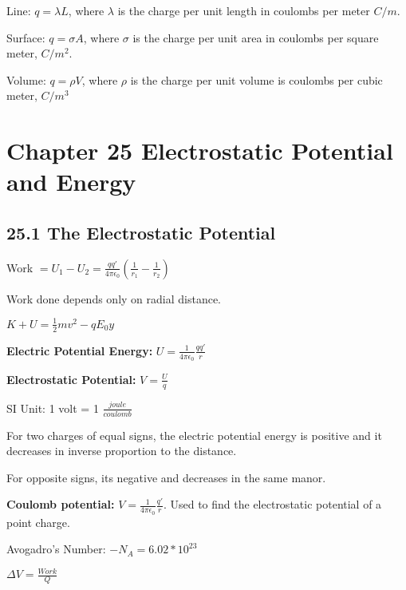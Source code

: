 \documentclass[twocolumn]{article}
\newenvironment{small_item}{
\begin{itemize}
  \setlength{\itemsep}{.25pt}
  \setlength{\parskip}{0pt}
  \setlength{\parsep}{0pt}
}{\end{itemize}}
\begin{document}
	\begin{small_item}
		\item Line: $q = \lambda L$, where $\lambda$ is the charge per unit length in coulombs per meter $C/m$.
		\item Surface: $q = \sigma A$, where $\sigma$ is the charge per unit area in coulombs per square meter, $C/m^2$.
		\item Volume: $q = \rho V$, where $\rho$ is the charge per unit volume is coulombs per cubic meter, $C/m^3$
	\end{small_item}
	
	
	
	
	\section*{Chapter 25 Electrostatic Potential and Energy} %
	\label{sec:chapter_25_electrostatic_potential_and_energy}
	
	\subsection*{25.1 The Electrostatic Potential} %
	\label{sub:25_1_the_electrostatic_potential}
	
	\begin{small_item}
		\item Work $= U_1 - U_2 = \frac{qq'}{4\pi\epsilon_0}(\frac{1}{r_1}
		-\frac{1}{r_2})$
		\item Work done depends only on radial distance.
		\item $K + U = \frac{1}{2}mv^2 - qE_0y$
		\item \textbf{Electric Potential Energy:} $U = \frac{1}{4\pi\epsilon_0}\frac{qq'}{r}$
		\item \textbf{Electrostatic Potential:} $V = \frac{U}{q}$
		\item SI Unit: 1 volt = 1 $\frac{joule}{coulomb}$
		\item For two charges of equal signs, the electric potential energy is positive and it decreases in inverse proportion to the distance.
		\item For opposite signs, its negative and decreases in the same manor.
		\item \textbf{Coulomb potential:} $V = \frac{1}{4\pi\epsilon_0}\frac{q'}{r}$.  Used to find the electrostatic potential of a point charge.
		\item Avogadro’s Number: $-N_A = 6.02*10^{23}$
		\item $\Delta V = \frac{Work}{Q}$
	\end{small_item}
	
\end{document}
